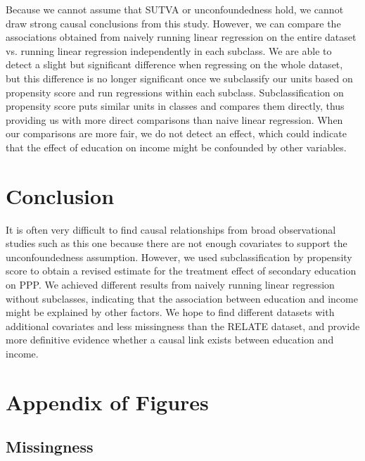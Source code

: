\documentclass[letterpaper,11pt]{article}
\begin{document}
Because we cannot assume that SUTVA or unconfoundedness hold, we cannot draw
strong causal conclusions from this study. However, we can compare the
associations obtained from naively running linear regression on the entire
dataset vs. running linear regression independently in each subclass. We are
able to detect a slight but significant difference when regressing on the whole
dataset, but this difference is no longer significant once we subclassify our
units based on propensity score and run regressions within each subclass.
Subclassification on propensity score puts similar units in classes and compares
them directly, thus providing us with more direct comparisons than naive linear
regression. When our comparisons are more fair, we do not detect an effect,
which could indicate that the effect of education on income might be confounded
by other variables.


\section{Conclusion}

It is often very difficult to find causal relationships from broad observational
studies such as this one because there are not enough covariates to support the
unconfoundedness assumption. However, we used subclassification by propensity
score to obtain a revised estimate for the treatment effect of secondary
education on PPP. We achieved different results from naively running linear
regression without subclasses, indicating that the association between education
and income might be explained by other factors.  We hope to find different
datasets with additional covariates and less missingness than the RELATE
dataset, and provide more definitive evidence whether a causal link exists
between education and income.

 



\clearpage{}

\appendix


\section{Appendix of Figures}


\subsection{Missingness}
\end{document}
